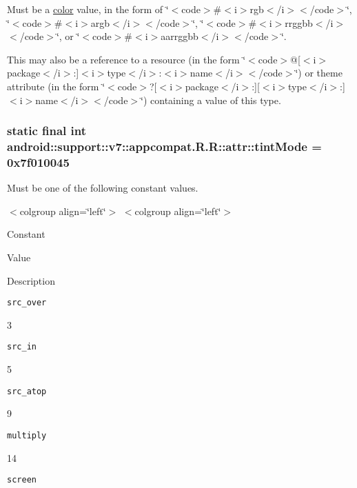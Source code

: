 Must be a \hyperlink{classandroid_1_1support_1_1v7_1_1appcompat_1_1_r_1_1color}{color} value, in the form of \char`\"{}$<$code$>$\#$<$i$>$rgb$<$/i$>$$<$/code$>$\char`\"{}, \char`\"{}$<$code$>$\#$<$i$>$argb$<$/i$>$$<$/code$>$\char`\"{}, \char`\"{}$<$code$>$\#$<$i$>$rrggbb$<$/i$>$$<$/code$>$\char`\"{}, or \char`\"{}$<$code$>$\#$<$i$>$aarrggbb$<$/i$>$$<$/code$>$\char`\"{}. 

This may also be a reference to a resource (in the form \char`\"{}$<$code$>$@\mbox{[}$<$i$>$package$<$/i$>$:\mbox{]}$<$i$>$type$<$/i$>$:$<$i$>$name$<$/i$>$$<$/code$>$\char`\"{}) or theme attribute (in the form \char`\"{}$<$code$>$?\mbox{[}$<$i$>$package$<$/i$>$:\mbox{]}\mbox{[}$<$i$>$type$<$/i$>$:\mbox{]}$<$i$>$name$<$/i$>$$<$/code$>$\char`\"{}) containing a value of this type. \hypertarget{classandroid_1_1support_1_1v7_1_1appcompat_1_1_r_1_1attr_b82622a91200a37956c3f1afa0a1412f}{
\subsubsection[{tintMode}]{\setlength{\rightskip}{0pt plus 5cm}static final int android::support::v7::appcompat.R.R::attr::tintMode = 0x7f010045}}
\label{classandroid_1_1support_1_1v7_1_1appcompat_1_1_r_1_1attr_b82622a91200a37956c3f1afa0a1412f}


Must be one of the following constant values. \begin{TabularC}{0}
\hline
\end{TabularC}
$<$colgroup align=\char`\"{}left\char`\"{}$>$ $<$colgroup align=\char`\"{}left\char`\"{}$>$ 

Constant

Value

Description 

{\tt src\_\-over}

3

{\tt src\_\-in}

5

{\tt src\_\-atop}

9

{\tt multiply}

14

{\tt screen}

